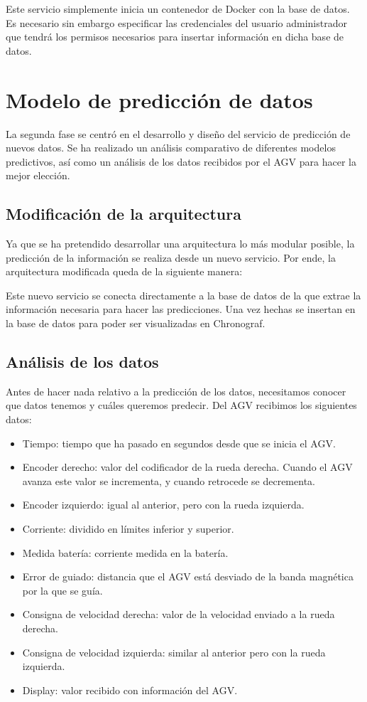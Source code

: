 Este servicio simplemente inicia un contenedor de Docker con la base de datos. Es necesario sin embargo 
especificar las credenciales del usuario administrador que tendrá los permisos necesarios para insertar 
información en dicha base de datos.

\section{Modelo de predicción de datos}

La segunda fase se centró en el desarrollo y diseño del servicio de predicción de nuevos datos.
Se ha realizado un análisis comparativo de diferentes modelos predictivos, así como un análisis
de los datos recibidos por el AGV para hacer la mejor elección.

\subsection{Modificación de la arquitectura}

Ya que se ha pretendido desarrollar una arquitectura lo más modular posible, la predicción de la 
información se realiza desde un nuevo servicio. Por ende, la arquitectura modificada queda de la 
siguiente manera:


Este nuevo servicio se conecta directamente a la base de datos de la que extrae la 
información necesaria para hacer las predicciones. Una vez hechas se insertan en la base de datos 
para poder ser visualizadas en Chronograf.

\subsection{Análisis de los datos}

Antes de hacer nada relativo a la predicción de los datos, necesitamos conocer que datos tenemos y cuáles 
queremos predecir. Del AGV recibimos los siguientes datos:
\begin{itemize}
    \item Tiempo: tiempo que ha pasado en segundos desde que se inicia el AGV.
    \item Encoder derecho: valor del codificador de la rueda derecha. Cuando el AGV avanza este valor se
        incrementa, y cuando retrocede se decrementa.
    \item Encoder izquierdo: igual al anterior, pero con la rueda izquierda.
    \item Corriente: dividido en límites inferior y superior.
    \item Medida batería: corriente medida en la batería.
    \item Error de guiado: distancia que el AGV está desviado de la banda magnética por la que se guía.
    \item Consigna de velocidad derecha: valor de la velocidad enviado a la rueda derecha.
    \item Consigna de velocidad izquierda: similar al anterior pero con la rueda izquierda.
    \item Display: valor recibido con información del AGV.
\end{itemize}

